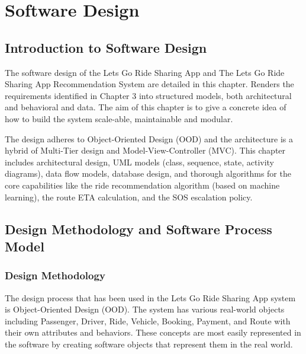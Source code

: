 \chapter{Software Design}
\justifying

\section{Introduction to Software Design}

The software design of the Lets Go Ride Sharing App and The Lets Go Ride Sharing App Recommendation System are detailed in this chapter. Renders the requirements identified in Chapter 3 into structured models, both architectural and behavioral and data. The aim of this chapter is to give a concrete idea of how to build the system scale-able, maintainable and modular.

The design adheres to Object-Oriented Design (OOD) and the architecture is a hybrid of Multi-Tier design and Model-View-Controller (MVC). This chapter includes architectural design, UML models (class, sequence, state, activity diagrams), data flow models, database design, and thorough algorithms for the core capabilities like the ride recommendation algorithm (based on machine learning), the route ETA calculation, and the SOS escalation policy.

\section{Design Methodology and Software Process Model}

\subsection{Design Methodology}

The design process that has been used in the Lets Go Ride Sharing App system is Object-Oriented Design (OOD). The system has various real-world objects including Passenger, Driver, Ride, Vehicle, Booking, Payment, and Route with their own attributes and behaviors. These concepts are most easily represented in the software by creating software objects that represent them in the real world.

